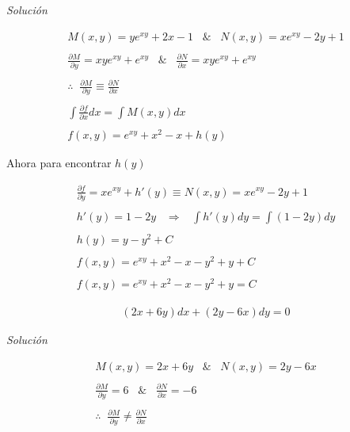 \textit{Solución}

\begin{equation*}
    \begin{gathered}
        M(x,y)=ye^{xy}+2x-1\;\;\;\&\;\;\;N(x,y)=xe^{xy}-2y+1\\\\
        \frac{\partial{M}}{\partial{y}}=xye^{xy}+e^{xy}\;\;\;\&\;\;\;\frac{\partial{N}}{\partial{x}}=xye^{xy}+e^{xy}\\\\
        \therefore\;\;\frac{\partial{M}}{\partial{y}}\equiv\frac{\partial{N}}{\partial{x}}\\\\
        \int\frac{\partial{f}}{\partial{x}}dx=\int M(x,y)dx\\\\
        f(x,y)=e^{xy}+x^{2}-x+h(y)
    \end{gathered}
\end{equation*}

Ahora para encontrar \(\displaystyle h(y)\)

\begin{equation*}
    \begin{gathered}
        \frac{\partial{f}}{\partial{y}}=xe^{xy}+h'(y)\equiv N(x,y)=xe^{xy}-2y+1\\\\
        h'(y)=1-2y\;\;\;\Rightarrow\;\;\;\int h'(y)dy=\int(1-2y)dy\\\\
        h(y)=y-y^{2}+C\\\\
        f(x,y)=e^{xy}+x^{2}-x-y^{2}+y+C\\\\
        f(x,y)=e^{xy}+x^{2}-x-y^{2}+y=C
    \end{gathered}
\end{equation*}

\vspace{1cm}

\begin{equation}
    \begin{gathered}
        (2x+6y)dx+(2y-6x)dy=0
    \end{gathered}
\end{equation}

\textit{Solución}

\begin{equation*}
    \begin{gathered}
        M(x,y)=2x+6y\;\;\;\&\;\;\;N(x,y)=2y-6x\\\\
        \frac{\partial{M}}{\partial{y}}=6\;\;\;\&\;\;\;\frac{\partial{N}}{\partial{x}}=-6\\\\
        \therefore\;\;\frac{\partial{M}}{\partial{y}}\neq\frac{\partial{N}}{\partial{x}}
    \end{gathered}
\end{equation*}

